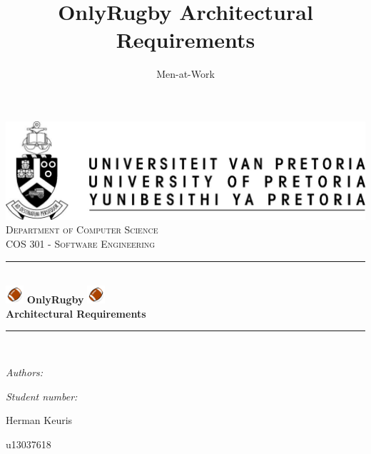 \documentclass[hidelinks,a4paper,12pt]{article}
\author{Men-at-Work}
\title{ OnlyRugby Architectural Requirements}
\newcommand{\HRule}{\rule{\linewidth}{0.5mm}}
\begin{document}
\setlength{\parskip}{6pt}

\begin{titlepage}

\begin{center}
\includegraphics[width=1\textwidth]{./up-logo.jpg}\\[0.4cm]    
\textsc{\LARGE Department of Computer Science}\\[1.5cm]
\textsc{\Large COS 301 - Software Engineering}\\[0.5cm]
\HRule \\[0.4cm]
\includegraphics[width=0.05\textwidth]{./logo.png} 
{ \huge \bfseries OnlyRugby}
\includegraphics[width=0.05\textwidth]{./logo.png}\\[0.4cm] 
{ \huge \bfseries Architectural Requirements}\\[0.4cm]
\HRule \\[0.4cm]
\begin{minipage}{0.4\textwidth}
\begin{flushleft} \large
\emph{Authors:}
\end{flushleft}
\end{minipage}
\begin{minipage}{0.4\textwidth}
\begin{flushright} \large
\emph{Student number:}
\end{flushright}
\end{minipage}

\begin{minipage}{0.4\textwidth}
\begin{flushleft} \large
Herman {Keuris}
\end{flushleft}
\end{minipage}
\begin{minipage}{0.4\textwidth}
\begin{flushright} \large
\emph{}
u13037618
\end{flushright}
\end{minipage}


\end{center}
\end{titlepage}
\end{document}
